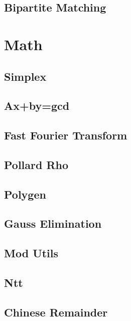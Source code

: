 \subsection{Bipartite Matching}

\section{Math}
\subsection{Simplex}

\subsection{Ax+by=gcd}

\subsection{Fast Fourier Transform}

\subsection{Pollard Rho}

\subsection{Polygen}

\subsection{Gauss Elimination}

\subsection{Mod Utils}

\subsection{Ntt}

\subsection{Chinese Remainder}

